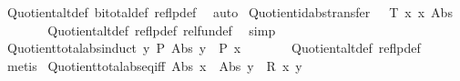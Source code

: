 \begin{isabellebody}
\ Quotient{\isacharunderscore}{\kern0pt}alt{\isacharunderscore}{\kern0pt}def\ bi{\isacharunderscore}{\kern0pt}total{\isacharunderscore}{\kern0pt}def\ reflp{\isacharunderscore}{\kern0pt}def\ \isamarkupfalse%
\ auto%
\endisatagproof
{\isafoldproof}%
%
\isadelimproof
\isanewline
%
\endisadelimproof
\isanewline
{}\isamarkupfalse%
\ Quotient{\isacharunderscore}{\kern0pt}id{\isacharunderscore}{\kern0pt}abs{\isacharunderscore}{\kern0pt}transfer{\isacharcolon}{\kern0pt}\ {\isachardoublequoteopen}{\isacharparenleft}{\kern0pt}{\isacharparenleft}{\kern0pt}{\isacharequal}{\kern0pt}{\isacharparenright}{\kern0pt}\ {\isacharequal}{\kern0pt}{\isacharequal}{\kern0pt}{\isacharequal}{\kern0pt}{\isachargreater}{\kern0pt}\ T{\isacharparenright}{\kern0pt}\ {\isacharparenleft}{\kern0pt}{\isasymlambda}x{\isachardot}{\kern0pt}\ x{\isacharparenright}{\kern0pt}\ Abs{\isachardoublequoteclose}\isanewline
%
\isadelimproof
\ \ %
\endisadelimproof
%
\isatagproof
{}\isamarkupfalse%
\ {}\ {}\ \isamarkupfalse%
\ Quotient{\isacharunderscore}{\kern0pt}alt{\isacharunderscore}{\kern0pt}def\ reflp{\isacharunderscore}{\kern0pt}def\ rel{\isacharunderscore}{\kern0pt}fun{\isacharunderscore}{\kern0pt}def\ \isamarkupfalse%
\ simp%
\endisatagproof
{\isafoldproof}%
%
\isadelimproof
\isanewline
%
\endisadelimproof
\isanewline
{}\isamarkupfalse%
\ Quotient{\isacharunderscore}{\kern0pt}total{\isacharunderscore}{\kern0pt}abs{\isacharunderscore}{\kern0pt}induct{\isacharcolon}{\kern0pt}\ {\isachardoublequoteopen}{\isacharparenleft}{\kern0pt}{\isasymAnd}y{\isachardot}{\kern0pt}\ P\ {\isacharparenleft}{\kern0pt}Abs\ y{\isacharparenright}{\kern0pt}{\isacharparenright}{\kern0pt}\ {\isasymLongrightarrow}\ P\ x{\isachardoublequoteclose}\isanewline
%
\isadelimproof
\ \ %
\endisadelimproof
%
\isatagproof
{}\isamarkupfalse%
\ {}\ {}\ \isamarkupfalse%
\ Quotient{\isacharunderscore}{\kern0pt}alt{\isacharunderscore}{\kern0pt}def\ reflp{\isacharunderscore}{\kern0pt}def\ \isamarkupfalse%
\ metis%
\endisatagproof
{\isafoldproof}%
%
\isadelimproof
\isanewline
%
\endisadelimproof
\isanewline
{}\isamarkupfalse%
\ Quotient{\isacharunderscore}{\kern0pt}total{\isacharunderscore}{\kern0pt}abs{\isacharunderscore}{\kern0pt}eq{\isacharunderscore}{\kern0pt}iff{\isacharcolon}{\kern0pt}\ {\isachardoublequoteopen}Abs\ x\ {\isacharequal}{\kern0pt}\ Abs\ y\ {\isasymlongleftrightarrow}\ R\ x\ y{\isachardoublequoteclose}\isanewline

\end{isabellebody}
